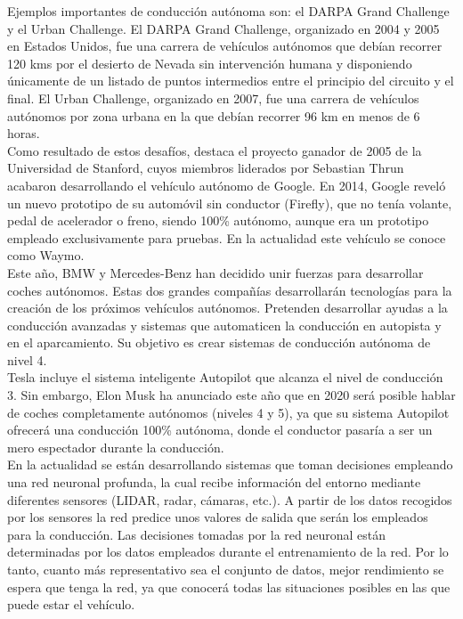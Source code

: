Ejemplos importantes de conducción autónoma son: el DARPA Grand Challenge y el Urban Challenge. El DARPA
Grand Challenge, organizado en 2004 y 2005 en Estados Unidos, fue una carrera de vehículos autónomos que debían recorrer 120 kms por el desierto de Nevada sin intervención humana y disponiendo únicamente de un listado de puntos intermedios entre el principio del circuito y el final.  El Urban Challenge, organizado en 2007, fue una carrera de vehículos autónomos por zona urbana en la que debían recorrer 96 km en menos de 6 horas.\\

Como resultado de estos desafíos, destaca el proyecto ganador de 2005 de la Universidad de Stanford, cuyos miembros liderados por Sebastian Thrun acabaron desarrollando el vehículo autónomo de Google. En 2014, Google reveló un nuevo prototipo de su automóvil sin conductor (Firefly), que no tenía volante, pedal de acelerador o freno, siendo 100\% autónomo, aunque era un prototipo empleado exclusivamente para pruebas. En la actualidad este vehículo se conoce como Waymo.\\

Este año, BMW y Mercedes-Benz han decidido unir fuerzas para desarrollar coches autónomos. Estas dos grandes compañías desarrollarán tecnologías para la creación de los próximos vehículos autónomos. Pretenden desarrollar ayudas a la conducción avanzadas y sistemas que automaticen la conducción en autopista y en el aparcamiento. Su objetivo es crear sistemas de conducción autónoma de nivel 4.\\

Tesla incluye el sistema inteligente Autopilot que alcanza el nivel de conducción 3. Sin embargo, Elon Musk ha anunciado este año que en 2020 será posible hablar de coches completamente autónomos (niveles 4 y 5), ya que su sistema Autopilot ofrecerá una conducción 100\% autónoma, donde el conductor pasaría a ser un mero espectador durante la conducción.\\

En la actualidad se están desarrollando sistemas que toman decisiones empleando una red neuronal profunda, la cual recibe información del entorno mediante diferentes sensores (LIDAR, radar, cámaras, etc.).  A partir de los datos recogidos por los sensores la red predice unos valores de salida que serán los empleados para la conducción.  Las decisiones tomadas por la red neuronal están determinadas por los datos empleados durante el entrenamiento de la red. Por lo tanto, cuanto más representativo sea el conjunto de datos, mejor rendimiento se espera que tenga la red, ya que conocerá todas las situaciones posibles en las que puede estar el vehículo.\\

